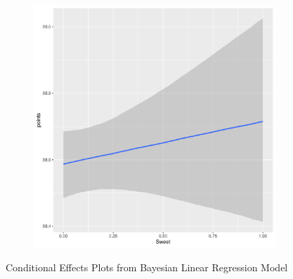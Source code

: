 \documentclass{article}
\begin{document}
\begin{figure}[htbp]
	\begin{subfigure}{0.22\textwidth}
		\centering
		\includegraphics[width=\textwidth]{imgs/Rplots-23.pdf}
	\end{subfigure}
	
	\caption{Conditional Effects Plots from Bayesian Linear Regression Model}
	\label{fig:conditional_effects}
\end{figure}




\end{document}

